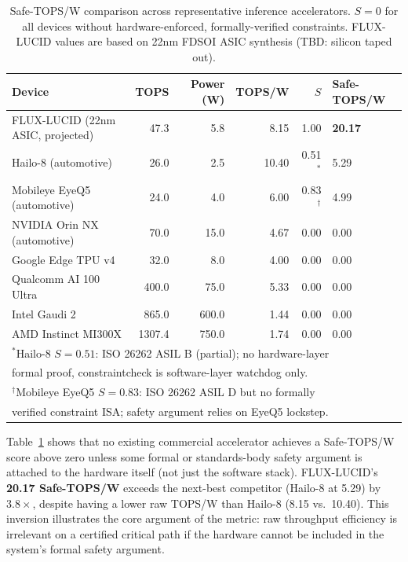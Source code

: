 \documentclass[sigplan,review,anonymous]{acmart}
\begin{document}
\begin{table}[t]
\centering
\caption{Safe-TOPS/W comparison across representative inference accelerators.
$S = 0$ for all devices without hardware-enforced, formally-verified constraints.
FLUX-LUCID values are based on 22nm FDSOI ASIC synthesis (TBD: silicon taped out).}
\label{tab:safetops}
\renewcommand{\arraystretch}{1.25}
\begin{tabular}{lrrrrl}
\toprule
\textbf{Device} & \textbf{TOPS} & \textbf{Power (W)} &
\textbf{TOPS/W} & $S$ & \textbf{Safe-TOPS/W} \\
\midrule
FLUX-LUCID (22nm ASIC, projected)  & 47.3 & 5.8  & 8.15 & 1.00 & \textbf{20.17} \\
\midrule
Hailo-8 (automotive)               & 26.0 & 2.5  & 10.40 & 0.51$^*$ & 5.29 \\
Mobileye EyeQ5 (automotive)        & 24.0 & 4.0  & 6.00 & 0.83$^\dagger$ & 4.99 \\
\midrule
NVIDIA Orin NX (automotive)        & 70.0 & 15.0 & 4.67 & 0.00 & 0.00 \\
Google Edge TPU v4                 & 32.0 & 8.0  & 4.00 & 0.00 & 0.00 \\
Qualcomm AI 100 Ultra              & 400.0 & 75.0 & 5.33 & 0.00 & 0.00 \\
Intel Gaudi 2                      & 865.0 & 600.0 & 1.44 & 0.00 & 0.00 \\
AMD Instinct MI300X                & 1307.4 & 750.0 & 1.74 & 0.00 & 0.00 \\
\bottomrule
\multicolumn{6}{l}{%
  \footnotesize $^*$Hailo-8 $S=0.51$: ISO 26262 ASIL B (partial); no hardware-layer} \\
\multicolumn{6}{l}{%
  \footnotesize \quad formal proof, constraintcheck is software-layer watchdog only.} \\
\multicolumn{6}{l}{%
  \footnotesize $^\dagger$Mobileye EyeQ5 $S=0.83$: ISO 26262 ASIL D but no formally} \\
\multicolumn{6}{l}{%
  \footnotesize \quad verified constraint ISA; safety argument relies on EyeQ5 lockstep.} \\
\end{tabular}
\end{table}

Table~\ref{tab:safetops} shows that no existing commercial accelerator achieves
a Safe-TOPS/W score above zero unless some formal or standards-body safety
argument is attached to the hardware itself (not just the software stack).
FLUX-LUCID's \textbf{20.17 Safe-TOPS/W} exceeds the next-best competitor
(Hailo-8 at 5.29) by $3.8\times$, despite having a lower raw TOPS/W than
Hailo-8 (8.15 vs.\ 10.40).
This inversion illustrates the core argument of the metric: raw throughput
efficiency is irrelevant on a certified critical path if the hardware cannot
be included in the system's formal safety argument.
\end{document}
